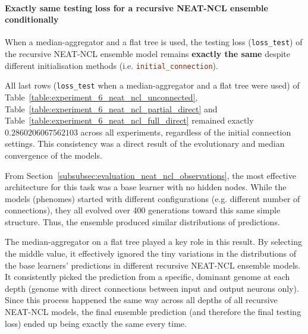 \paragraph{Exactly same testing loss for a recursive NEAT-NCL ensemble conditionally}
When a median-aggregator and a flat tree is used, the testing loss (\texttt{loss\_test}) of the recursive NEAT-NCL ensemble model remains \textbf{exactly the same} despite different initialisation methods (i.e. \lstinline[language=ini]|initial_connection|). 

All last rows (\texttt{loss\_test} when a median-aggregator and a flat tree were used) of Table~\ref{table:experiment_6_neat_ncl_unconnected}, Table~\ref{table:experiment_6_neat_ncl_partial_direct} and Table~\ref{table:experiment_6_neat_ncl_full_direct} remained exactly $0.2860206067562103$ across all experiments, regardless of the initial connection settings. This consistency was a direct result of the evolutionary and median convergence of the models. 

From Section~\ref{subsubsec:evaluation_neat_ncl_observations}, the most effective architecture for this task was a base learner with no hidden nodes. While the models (phenomes) started with different configurations (e.g. different number of connections), they all evolved over 400 generations toward this same simple structure. Thus, the ensemble produced similar distributions of predictions. 

The median-aggregator on a flat tree played a key role in this result. By selecting the middle value, it effectively ignored the tiny variations in the distributions of the base learners' predictions in different recursive NEAT-NCL ensemble models. It consistently picked the prediction from a specific, dominant genome at each depth (genome with direct connections between input and output neurons only). Since this process happened the same way across all depths of all recursive NEAT-NCL models, the final ensemble prediction (and therefore the final testing loss) ended up being exactly the same every time. 




